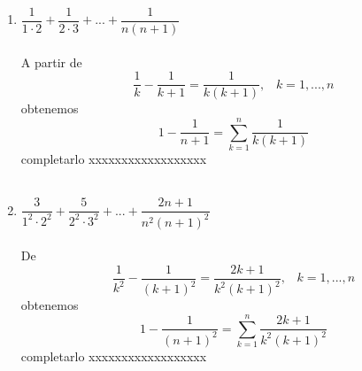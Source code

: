 \begin{enumerate}
\begin{enumerate}[\bfseries (i)]
\item $\dfrac{1}{1 \cdot 2} + \dfrac{1}{2 \cdot 3} + ... + \dfrac{1}{n(n+1)}$\\\\ 
A partir de $$\dfrac{1}{k} - \dfrac{1}{k+1} = \dfrac{1}{k(k+1)}, \; \; \; k=1,...,n$$ obtenemos $$1-\dfrac{1}{n+1} = \displaystyle\sum_{k=1}^n \dfrac{1}{k(k+1)}$$ {\color{green} completarlo xxxxxxxxxxxxxxxxxx}\\\\

\item $\dfrac{3}{1^2 \cdot 2^2} + \dfrac{5}{2^2 \cdot 3^2} + ... + \dfrac{2n +1}{n^2 (n+1)^2}$\\\\
De $$\dfrac{1}{k^2} - \dfrac{1}{(k+1)^2} = \dfrac{2k+1}{k^2(k+1)^2}, \; \; \; k=1,...,n$$ obtenemos $$1-\dfrac{1}{(n+1)^2} = \displaystyle\sum_{k=1}^n \dfrac{2k+1}{k^2(k+1)^2}$$ {\color{green} completarlo xxxxxxxxxxxxxxxxxx} \\\\
\end{enumerate}


\end{enumerate}
